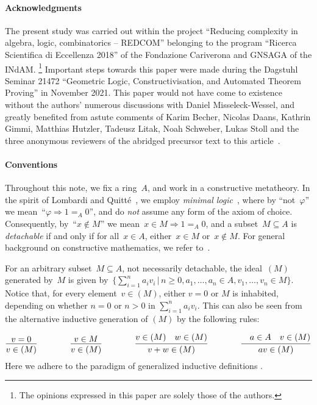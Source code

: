 \documentclass[com,11pt,crcready]{iosart2x}
\theoremstyle{definition}
\theoremstyle{plain}
\theoremstyle{remark}
\newcommand{\?}{\,{:}\,}
\renewcommand{\_}{\mathpunct{.}\,}
\begin{document}
\paragraph{Acknowledgments}
The present study was carried out within the project ``Reducing complexity in
algebra, logic, combinatorics -- REDCOM'' belonging to the program ``Ricerca
Scientifica di Eccellenza 2018'' of the Fondazione Cariverona and GNSAGA of the INdAM.%
\footnote{The opinions expressed in this paper are solely those of the
authors.} Important steps towards this paper were made
during the Dagstuhl Seminar 21472 ``Geometric Logic, Constructivisation, and
Automated Theorem Proving'' in November 2021. This paper would not have come to
existence without the authors' numerous discussions with Daniel Misseleck-Wessel, and
greatly benefited from astute comments of Karim Becher, Nicolas Daans, Kathrin Gimmi, Matthias Hutzler,
Tadeusz Litak,
Noah Schweber, Lukas Stoll and the three anonymous reviewers of the abridged
precursor text to this
article~\cite{blechschmidt-schuster:constructive-maximal-ideals}.

\paragraph{Conventions} Throughout this note, we fix a ring~$A$, and work in a constructive metatheory.
In the spirit of Lombardi and Quitté~\cite{lombardi-quitte:constructive-algebra}, we employ \emph{minimal
logic}~\cite{johansson:minimal}, where by ``not~$\varphi$'' we mean~``$\varphi \Rightarrow 1 =_A 0$'', and do \emph{not} assume any form of the axiom of choice. Consequently,
by~``$x \not\in M$'' we mean~$x \in M \Rightarrow 1 =_A 0$, and a subset~$M
\subseteq A$ is \emph{detachable} if and only if for all~$x \in A$, either~$x \in M$
or~$x \not\in M$. For general background on constructive mathematics, we refer
to~\cite{bauer:five-stages,bauer:int-mathematics,sep:constructive-mathematics}.

For an arbitrary subset~$M \subseteq A$, not necessarily
detachable, the ideal~$(M)$ generated by~$M$ is given by~$\bigl\{ \sum_{i=1}^n
a_i v_i \,\Big|\, n \geq 0, a_1,\ldots,a_n \in A, v_1,\ldots,v_n \in M \bigr\}$.
Notice that, for every element~$v \in (M)$, either $v = 0$ or $M$ is inhabited, depending on whether
$n=0$ or $n>0$ in $\sum_{i=1}^n a_i v_i$. This can also be seen from the alternative inductive
generation of $(M)$ by the following rules:\par
{\vspace*{-0.8em}\small\[
\infer{v \in (M)}{v=0}
\qquad\qquad
\infer{v \in (M)}{v \in M}
\qquad\qquad
\infer{v+w \in (M)}{v \in (M)\quad w \in (M)}
\qquad\qquad
\infer{av \in (M)}{\quad a\in A \quad v \in (M)}
\]}%
\noindent Here we adhere to the paradigm of generalized inductive definitions
\cite{aczel-rathjen:notes,aczel-rathjen:cstdraft,rathjen:genind,aczel:ind}.
\end{document}
